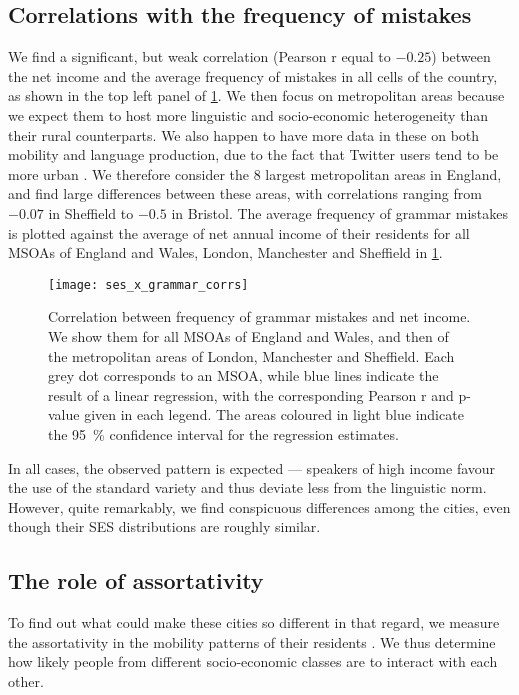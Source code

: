 \documentclass[../thesis.tex]{subfiles}
\begin{document}
\subsection{Correlations with the frequency of mistakes}
We find a significant, but weak correlation (Pearson r equal to $-0.25$) between the net
income and the average frequency of mistakes in all cells of the country, as shown in
the top left panel of \cref{fig:ses_x_grammar_corrs}. We then focus on metropolitan
areas because we expect them to host more linguistic and socio-economic heterogeneity
than their rural counterparts. We also happen to have more data in these on both
mobility and language production, due to the fact that Twitter users tend to be more
urban \cite{MisloveUnderstandingDemographics2011}. We therefore consider the $8$ largest
metropolitan areas in England, and find large differences between these areas, with
correlations ranging from $-0.07$ in Sheffield to $-0.5$ in Bristol. The average frequency
of grammar mistakes is plotted against the average of net annual income of their
residents for all \acp{MSOA} of England and Wales, London, Manchester and Sheffield in
\cref{fig:ses_x_grammar_corrs}.
\begin{figure}
\centering
  \texttt{[image: ses\_x\_grammar\_corrs]}
  \caption{ Correlation between frequency of grammar mistakes and net income. We show
  them for all \acp{MSOA} of England and Wales, and then of the metropolitan areas of
  London, Manchester and Sheffield. Each grey dot corresponds to an \ac{MSOA}, while
  blue lines indicate the result of a linear regression, with the corresponding Pearson
  r and p-value given in each legend. The areas coloured in light blue indicate the
  \SI{95}{\percent} confidence interval for the regression estimates.}
  \label{fig:ses_x_grammar_corrs}
\end{figure}
In all cases, the observed pattern is expected --- speakers of high income favour the
use of the standard variety and thus deviate less from the linguistic norm. However,
quite remarkably, we find conspicuous differences among the cities, even though their
\ac{SES} distributions are roughly similar. 


\subsection{The role of assortativity}
To find out what could make these cities so different in that regard, we measure the
assortativity in the mobility patterns of their residents
\cite{HilmanSocioeconomicBiases2022}. We thus determine how likely people from different
socio-economic classes are to interact with each other.
\end{document}
